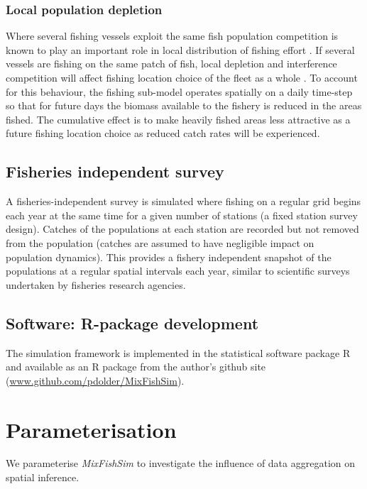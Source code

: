\documentclass[review]{elsarticle}
\begin{document}
\subsubsection{Local population depletion}

Where several fishing vessels exploit the same fish population competition is
known to play an important role in local distribution of fishing effort
\citep{Gillis1998}. If several vessels are fishing on the same patch of fish,
local depletion and interference competition will affect fishing location
choice of the fleet as a whole \citep{Rijnsdorp2000, Poos2007a}.  To account
for this behaviour, the fishing sub-model operates spatially on a daily
time-step so that for future days the biomass available to the fishery is
reduced in the areas fished. The cumulative effect is to make heavily fished
areas less attractive as a future fishing location choice as reduced catch
rates will be experienced. 

\subsection{Fisheries independent survey}

A fisheries-independent survey is simulated where fishing on a regular grid
begins each year at the same time for a given number of stations (a fixed
station survey design). Catches of the populations at each station are recorded
but not removed from the population (catches are assumed to have negligible
impact on population dynamics). This provides a fishery independent snapshot of
the populations at a regular spatial intervals each year, similar to scientific
surveys undertaken by fisheries research agencies. \\

\subsection{Software: R-package development}

The simulation framework is implemented in the statistical software package R
\citep{RCoreTeam2017} and available as an R package from the author's github
site (\url{www.github.com/pdolder/MixFishSim}).\\

\section{Parameterisation}
We parameterise \textit{MixFishSim} to investigate the influence of data
aggregation on spatial inference.
\end{document}
